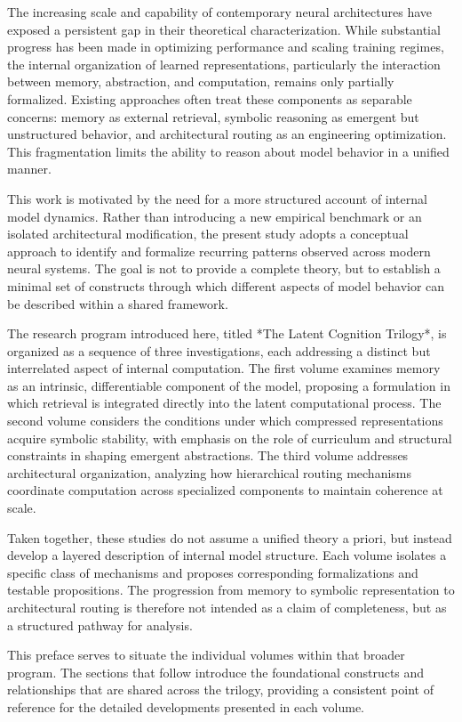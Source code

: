

The increasing scale and capability of contemporary neural architectures have exposed a persistent gap in their theoretical characterization. While substantial progress has been made in optimizing performance and scaling training regimes, the internal organization of learned representations, particularly the interaction between memory, abstraction, and computation, remains only partially formalized. Existing approaches often treat these components as separable concerns: memory as external retrieval, symbolic reasoning as emergent but unstructured behavior, and architectural routing as an engineering optimization. This fragmentation limits the ability to reason about model behavior in a unified manner.

This work is motivated by the need for a more structured account of internal model dynamics. Rather than introducing a new empirical benchmark or an isolated architectural modification, the present study adopts a conceptual approach to identify and formalize recurring patterns observed across modern neural systems. The goal is not to provide a complete theory, but to establish a minimal set of constructs through which different aspects of model behavior can be described within a shared framework.

The research program introduced here, titled *The Latent Cognition Trilogy*, is organized as a sequence of three investigations, each addressing a distinct but interrelated aspect of internal computation. The first volume examines memory as an intrinsic, differentiable component of the model, proposing a formulation in which retrieval is integrated directly into the latent computational process. The second volume considers the conditions under which compressed representations acquire symbolic stability, with emphasis on the role of curriculum and structural constraints in shaping emergent abstractions. The third volume addresses architectural organization, analyzing how hierarchical routing mechanisms coordinate computation across specialized components to maintain coherence at scale.

Taken together, these studies do not assume a unified theory a priori, but instead develop a layered description of internal model structure. Each volume isolates a specific class of mechanisms and proposes corresponding formalizations and testable propositions. The progression from memory to symbolic representation to architectural routing is therefore not intended as a claim of completeness, but as a structured pathway for analysis.

This preface serves to situate the individual volumes within that broader program. The sections that follow introduce the foundational constructs and relationships that are shared across the trilogy, providing a consistent point of reference for the detailed developments presented in each volume.
